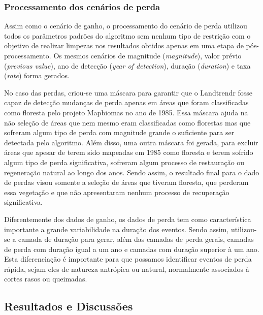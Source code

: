 \subsubsection{Processamento dos cenários de perda}
\hspace{13pt} Assim como o cenário de ganho, o processamento do cenário de perda utilizou todos os parâmetros padrões do algoritmo sem nenhum tipo de restrição com o objetivo de realizar limpezas nos resultados obtidos apenas em uma etapa de pós-processamento. Os mesmos cenários de magnitude (\textit{magnitude}), valor prévio (\textit{previous value}), ano de detecção (\textit{year of detection}), duração (\textit{duration}) e taxa (\textit{rate}) forma gerados.

No caso das perdas, criou-se uma máscara para garantir que o Landtrendr fosse capaz de detecção mudanças de perda apenas em áreas que foram classificadas como floresta pelo projeto Mapbiomas no ano de 1985. Essa máscara ajuda na não seleção de áreas que nem mesmo eram classificadas como florestas mas que sofreram algum tipo de perda com magnitude grande o suficiente para ser detectada pelo algoritmo. Além disso, uma outra máscara foi gerada, para excluir áreas que apesar de terem sido mapeadas em 1985 como floresta e terem sofrido algum tipo de perda significativa, sofreram algum processo de restauração ou regeneração natural ao longo dos anos. Sendo assim, o resultado final para o dado de perdas visou somente a seleção de áreas que tiveram floresta, que perderam essa vegetação e que não apresentaram nenhum processo de recuperação significativa.

Diferentemente dos dados de ganho, os dados de perda tem como característica importante a grande variabilidade na duração dos eventos. Sendo assim, utilizou-se a camada de duração para gerar, além das camadas de perda gerais, camadas de perda com duração igual a um ano e camadas com duração superior à um ano. Esta diferenciação é importante para que possamos identificar eventos de perda rápida, sejam eles de natureza antrópica ou natural, normalmente associados à cortes rasos ou queimadas. 


\subsection{Resultados e Discussões}

